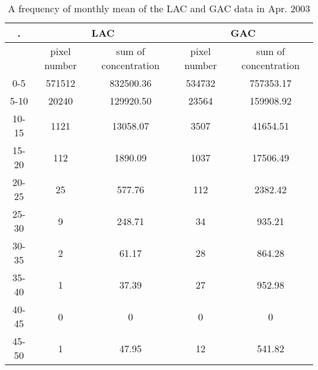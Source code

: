  \begin{table}[h]%
	\caption{A frequency of monthly mean of the LAC and GAC data in Apr. 2003}
	\label{frequency_04apr}
	\centering
	\begin{tabular}{c c c c c}%
		\hline \setlength{\arrayrulewidth}{0.8pt}. 
		&\multicolumn{2}{c}{LAC} 		&\multicolumn{2}{c}{GAC}\\ \hline
			& pixel number & sum of concentration & pixel number & sum of concentration \\ \hline
		0-5	&571512	&832500.36	&534732	&757353.17 \\ \hline
		5-10	&20240	&129920.50	&23564	&159908.92 \\ \hline
		10-15	&1121	&13058.07	&3507	&41654.51 \\ \hline
		15-20	&112	&1890.09	&1037	&17506.49 \\ \hline
		20-25	&25	&577.76	&112	&2382.42 \\ \hline
		25-30	&9	&248.71	&34	&935.21 \\ \hline
		30-35	&2	&61.17	&28	&864.28 \\ \hline 
		35-40	&1	&37.39	&27	&952.98 \\ \hline
		40-45	&0	&0	&0	&0 \\ \hline
		45-50	&1	&47.95	&12	&541.82 \\ \hline
		\end{tabular}
\end{table}